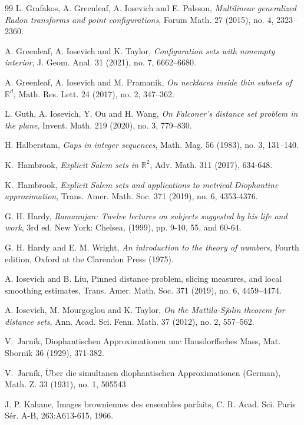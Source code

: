 \documentclass[a4paper,11pt]{amsart}
\numberwithin{equation}{section}
\begin{document}
\begin{thebibliography}{99}
 L. Grafakos, A. Greenleaf, A. Iosevich and E. Palsson, \textit{Multilinear generalized Radon transforms
and point configurations}, Forum Math. 27 (2015), no. 4, 2323–2360. 

 A. Greenleaf, A. Iosevich and K. Taylor, \textit{Configuration sets with nonempty interior}, J. Geom. Anal. 31 (2021), no. 7, 6662–6680.

 A. Greenleaf, A. Iosevich and M. Pramanik, \textit{On necklaces inside thin subsets of $\mathbb R^d$}, Math. Res. Lett. 24 (2017), no. 2, 347–362. 

 L. Guth, A. Iosevich, Y. Ou and H. Wang, \textit{On Falconer's distance set problem in the plane}, Invent. Math. 219 (2020), no. 3, 779–830. 

 H. Halberstam, \textit{Gaps in integer sequences}, Math. Mag. 56 (1983), no. 3, 131–140. 

 K.~Hambrook, \textit{Explicit Salem sets in $\mathbb R^2$}, Adv. Math. 311 (2017), 634-648.

 K.~Hambrook, \textit{Explicit Salem sets and applications to metrical Diophantine approximation},
Trans. Amer. Math. Soc. 371 (2019), no. 6, 4353-4376.

 G. H. Hardy, \textit{Ramanujan: Twelve lectures on subjects suggested by his life and work}, 3rd ed. New York: Chelsea, (1999), pp. 9-10, 55, and 60-64.

 G. H. Hardy and E. M. Wright, \textit{An introduction to the theory of numbers}, Fourth edition, Oxford at the Clarendon Press (1975). 

 A. Iosevich and B. Liu, Pinned distance problem, slicing measures, and local smoothing estimates, Trans. Amer. Math. Soc. 371 (2019), no. 6, 4459–4474.

 A. Iosevich, M. Mourgoglou and K. Taylor, \textit{On the Mattila-Sj$\ddot{\text{o}}$lin theorem for distance sets}, Ann. Acad. Sci. Fenn. Math. 37 (2012), no. 2, 557–562.

 V.~Jarn\'ik, Diophantischen Approximationen unc Hausdorffsches Mass, Mat. Sbornik 36
(1929), 371-382.

 V.~Jarn\'ik, $\ddot{\text{U}}$ber die simultanen diophantischen Approximationen (German), Math. Z. 33
(1931), no. 1, 505543

 J. P. Kahane, Images browniennes des ensembles parfaits, C. R. Acad. Sci. Paris S\'er. A-B,
263:A613-615, 1966.


\end{thebibliography}
\end{document}
